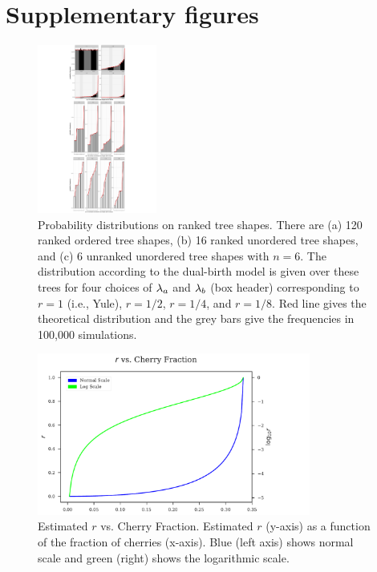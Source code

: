 \section{Supplementary figures}
\begin{figure} %
\centering
\includegraphics[width=0.35\textwidth]{figs/dualbirth-tree-prob-dists}
\caption[Probability distributions on ranked tree shapes]
{Probability distributions on ranked tree shapes. There are (a) 120 ranked ordered tree shapes, (b) 16 ranked unordered tree shapes, and (c) 6 unranked unordered tree shapes with $n=6$. The distribution according to the dual-birth model is given over these trees for four choices of $\lambda_a$ and $\lambda_b$ (box header) corresponding to $r=1$ (i.e., Yule), $r=1/2$, $r=1/4$, and $r=1/8$. Red line gives the theoretical distribution and the grey bars give the frequencies in 100,000 simulations.}
\label{fig:dualbirth-tree-prob-dists}
\end{figure}

\begin{figure} %
\centering
\includegraphics[width=0.8\textwidth]{figs/dualbirth-sup-cvsr}
\caption[Estimated $r$ vs. Cherry Fraction]
{Estimated $r$ vs. Cherry Fraction. Estimated $r$ (y-axis) as a function of the fraction of cherries (x-axis). Blue (left axis) shows normal scale and green (right) shows the logarithmic scale.}
\label{fig:dualbirth-sup-cvsr}
\end{figure}

